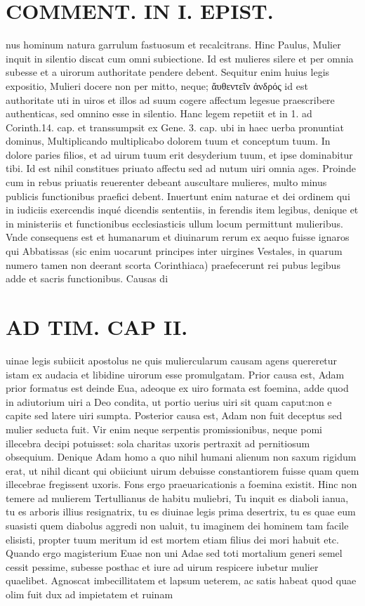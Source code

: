 \documentclass{article}
\begin{document}
\begin{pages}
\section*{COMMENT. IN I. EPIST. }\pstart nus hominum natura garrulum fastuosum et recalcitrans. Hinc Paulus, Mulier inquit in silentio discat cum omni subiectione. Id est mulieres silere et per omnia subesse et a uirorum authoritate pendere debent. Sequitur enim huius legis expositio, Mulieri docere non per mitto, neque; ἄυθεντεῖν ἀνδρός id est authoritate uti in uiros et illos ad suum cogere affectum legesue praescribere authenticas, sed omnino esse in silentio. Hanc legem repetiit et in 1. ad Corinth.14. cap. et transsumpsit ex Gene. 3. cap. ubi in haec uerba pronuntiat dominus, Multiplicando multiplicabo dolorem tuum et conceptum tuum. In dolore paries filios, et ad uirum tuum erit desyderium tuum, et ipse dominabitur tibi. Id est nihil constitues priuato affectu sed ad nutum uiri omnia ages. Proinde cum in rebus priuatis reuerenter debeant auscultare mulieres, multo minus publicis functionibus praefici debent. Inuertunt enim naturae et dei ordinem qui in iudiciis exercendis inqué dicendis sententiis, in ferendis item legibus, denique et in ministeriis et functionibus ecclesiasticis ullum locum permittunt mulieribus. Vnde consequens est et humanarum et diuinarum rerum ex aequo fuisse ignaros qui Abbatissas (sic enim uocarunt principes inter uirgines Vestales, in quarum numero tamen non deerant scorta Corinthiaca) praefecerunt rei pubus  legibus adde et sacris functionibus. Causas di\pend
\section*{AD TIM. CAP II. }
\marginpar{[ p.121 ]}\pstart uinae legis subiicit apostolus ne quis muliercularum causam agens quereretur istam ex audacia et libidine uirorum esse promulgatam. Prior causa est, Adam prior formatus est deinde Eua, adeoque ex uiro formata est foemina, adde quod in adiutorium uiri a Deo condita, ut portio uerius uiri sit quam caput:non e capite sed latere uiri sumpta. Posterior causa est, Adam non fuit deceptus sed mulier seducta fuit. Vir enim neque serpentis promissionibus, neque pomi illecebra decipi potuisset: sola charitas uxoris pertraxit ad pernitiosum obsequium. Denique Adam homo a quo nihil humani alienum non saxum rigidum erat, ut nihil dicant qui obiiciunt uirum debuisse constantiorem fuisse quam quem illecebrae fregissent uxoris. Fons ergo praeuaricationis a foemina existit. Hinc non temere ad mulierem Tertullianus de habitu muliebri, Tu inquit es diaboli ianua, tu es arboris illius resignatrix, tu es diuinae legis prima desertrix, tu es quae eum suasisti quem diabolus aggredi non ualuit, tu imaginem dei hominem tam facile elisisti, propter tuum meritum id est mortem etiam filius dei mori habuit etc. Quando ergo magisterium Euae non uni Adae sed toti mortalium generi semel cessit pessime, subesse posthac et iure ad uirum respicere iubetur mulier quaelibet. Agnoscat imbecillitatem et lapsum ueterem, ac satis habeat quod quae olim fuit dux ad impietatem et ruinam  \pend

\end{pages}
\end{document}
